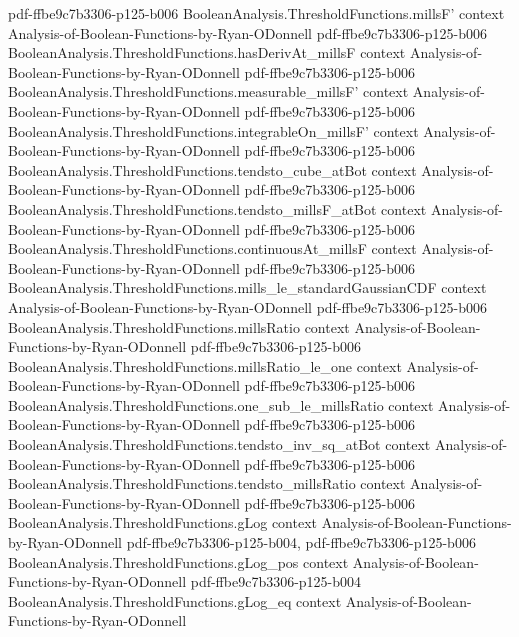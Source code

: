 \begin{theorem}
  {pdf-ffbe9c7b3306-p125-b006}
\proofstep
  {BooleanAnalysis.ThresholdFunctions.millsF'}
  {context}
  {Analysis-of-Boolean-Functions-by-Ryan-ODonnell}
  {pdf-ffbe9c7b3306-p125-b006}
\proofstep
  {BooleanAnalysis.ThresholdFunctions.hasDerivAt_millsF}
  {context}
  {Analysis-of-Boolean-Functions-by-Ryan-ODonnell}
  {pdf-ffbe9c7b3306-p125-b006}
\proofstep
  {BooleanAnalysis.ThresholdFunctions.measurable_millsF'}
  {context}
  {Analysis-of-Boolean-Functions-by-Ryan-ODonnell}
  {pdf-ffbe9c7b3306-p125-b006}
\proofstep
  {BooleanAnalysis.ThresholdFunctions.integrableOn_millsF'}
  {context}
  {Analysis-of-Boolean-Functions-by-Ryan-ODonnell}
  {pdf-ffbe9c7b3306-p125-b006}
\proofstep
  {BooleanAnalysis.ThresholdFunctions.tendsto_cube_atBot}
  {context}
  {Analysis-of-Boolean-Functions-by-Ryan-ODonnell}
  {pdf-ffbe9c7b3306-p125-b006}
\proofstep
  {BooleanAnalysis.ThresholdFunctions.tendsto_millsF_atBot}
  {context}
  {Analysis-of-Boolean-Functions-by-Ryan-ODonnell}
  {pdf-ffbe9c7b3306-p125-b006}
\proofstep
  {BooleanAnalysis.ThresholdFunctions.continuousAt_millsF}
  {context}
  {Analysis-of-Boolean-Functions-by-Ryan-ODonnell}
  {pdf-ffbe9c7b3306-p125-b006}
\proofstep
  {BooleanAnalysis.ThresholdFunctions.mills_le_standardGaussianCDF}
  {context}
  {Analysis-of-Boolean-Functions-by-Ryan-ODonnell}
  {pdf-ffbe9c7b3306-p125-b006}
\proofstep
  {BooleanAnalysis.ThresholdFunctions.millsRatio}
  {context}
  {Analysis-of-Boolean-Functions-by-Ryan-ODonnell}
  {pdf-ffbe9c7b3306-p125-b006}
\proofstep
  {BooleanAnalysis.ThresholdFunctions.millsRatio_le_one}
  {context}
  {Analysis-of-Boolean-Functions-by-Ryan-ODonnell}
  {pdf-ffbe9c7b3306-p125-b006}
\proofstep
  {BooleanAnalysis.ThresholdFunctions.one_sub_le_millsRatio}
  {context}
  {Analysis-of-Boolean-Functions-by-Ryan-ODonnell}
  {pdf-ffbe9c7b3306-p125-b006}
\proofstep
  {BooleanAnalysis.ThresholdFunctions.tendsto_inv_sq_atBot}
  {context}
  {Analysis-of-Boolean-Functions-by-Ryan-ODonnell}
  {pdf-ffbe9c7b3306-p125-b006}
\proofstep
  {BooleanAnalysis.ThresholdFunctions.tendsto_millsRatio}
  {context}
  {Analysis-of-Boolean-Functions-by-Ryan-ODonnell}
  {pdf-ffbe9c7b3306-p125-b006}
\proofstep
  {BooleanAnalysis.ThresholdFunctions.gLog}
  {context}
  {Analysis-of-Boolean-Functions-by-Ryan-ODonnell}
  {pdf-ffbe9c7b3306-p125-b004,
    pdf-ffbe9c7b3306-p125-b006}
\proofstep
  {BooleanAnalysis.ThresholdFunctions.gLog_pos}
  {context}
  {Analysis-of-Boolean-Functions-by-Ryan-ODonnell}
  {pdf-ffbe9c7b3306-p125-b004}
\proofstep
  {BooleanAnalysis.ThresholdFunctions.gLog_eq}
  {context}
  {Analysis-of-Boolean-Functions-by-Ryan-ODonnell}

\end{theorem}
